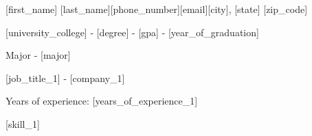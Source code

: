 \documentclass{casual}
\begin{document}
\begin{info}{[first\_name] [last\_name]}{[phone\_number]}{[email]}{[city], [state] [zip\_code]}
\end{info}

	\begin{desc}{[university\_college] - [degree] - [gpa] - [year\_of\_graduation]}
		\item{Major - [major]} 
	\end{desc}

	\begin{desc}{[job\_title\_1] - [company\_1]}
		\item{Years of experience: [years\_of\_experience\_1]}
	\end{desc}
\largespace

	\begin{desc}{}
	\item{[skill\_1]}
	\end{desc}
\vspace{2mm} 
\end{document}
